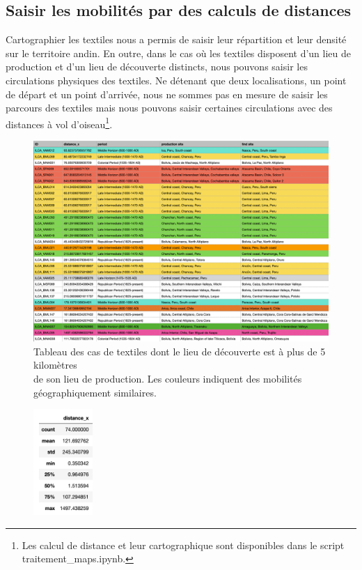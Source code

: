 \subsection{Saisir les mobilités par des calculs de distances}

Cartographier les textiles nous a permis de saisir leur répartition et leur densité sur le territoire andin. En outre, dans le cas où les textiles disposent d'un lieu de production et d'un lieu de découverte distincts, nous pouvons saisir les circulations physiques des textiles. Ne détenant que deux localisations, un point de départ et un point d'arrivée, nous ne sommes pas en mesure de saisir les parcours des textiles mais nous pouvons saisir certaines circulations avec des distances à vol d'oiseau\footnote{Les calcul de distance et leur cartographique sont disponibles dans le script traitement\_maps.ipynb.}.

\begin{figure}[!h]
	\begin{center}
		\includegraphics[width=16cm]{../images/tabDistance.png}
		\caption{Tableau des cas de textiles dont le lieu de découverte est à plus de 5 kilomètres \\ de son lieu de production. Les couleurs indiquent des mobilités géographiquement similaires.}
		\label{fig:distancetab}
	 \end{center}
\end{figure}

\clearpage

\begin{figure}
    \centering
    \includegraphics[width=0.2\textwidth]{../images/stat_distance.png}
    \label{fig:distance}
\end{figure}

